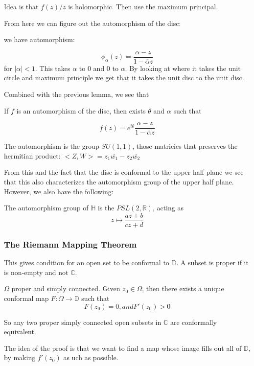 \documentclass[main.tex]{subfiles}
\begin{document}
Idea is that $f(z)/z$ is holomorphic. Then use the maximum principal.

From here we can figure out the automorphism of the disc:

we have automorphism:

$$
\phi_\alpha(z) = \frac{\alpha - z}{1 - \overline{\alpha} z}
$$
for $|\alpha| < 1$. This takes $\alpha$ to $0$ and $0$ to $\alpha$. By looking at where it takes the unit circle and maximum principle we get that it takes the unit disc to the unit disc.

Combined with the previous lemma, we see that
\begin{theorem}
If $f$ is an automorphism of the disc, then exists $\theta$ and $\alpha$ such that 

$$
f(z) = e^{i\theta}\frac{\alpha - z}{1 - \overline{\alpha} z}
$$
\end{theorem}

The automorphism is the group $SU(1,1)$, those matricies that preserves the hermitian product:
$<Z, W> = z_1 \overline{w_1} - z_2 \overline{w_2}$

From this and the fact that the disc is conformal to the upper half plane we see that this also characterizes the automorphism group of the upper half plane. However, we also have the following:

\begin{theorem}
The automorphism group of $\mathbb{H}$ is the $PSL(2, \mathbb{R})$, acting as 
$$
z \mapsto \frac{az +b}{cz + d}
$$
\end{theorem}

\subsubsection{The Riemann Mapping Theorem}
This gives condition for an open set to be conformal to $\mathbb{D}$. A subset is proper if it is non-empty and not $\mathbb{C}$.

\begin{theorem}
$\Omega$ proper and simply connected. Given $z_0 \in \Omega$, then there exists a unique conformal map $F: \Omega \rightarrow \mathbb{D}$ such that 
$$
F(z_0) = 0, and F'(z_0) > 0
$$
\end{theorem}
So any two proper simply connected open subsets in $\mathbb{C}$ are conformally equivalent.

The idea of the proof is that we want to find a map whose image fills out all of $\mathbb{D}$, by making $f'(z_0)$ as uch as possible.
\end{document}
